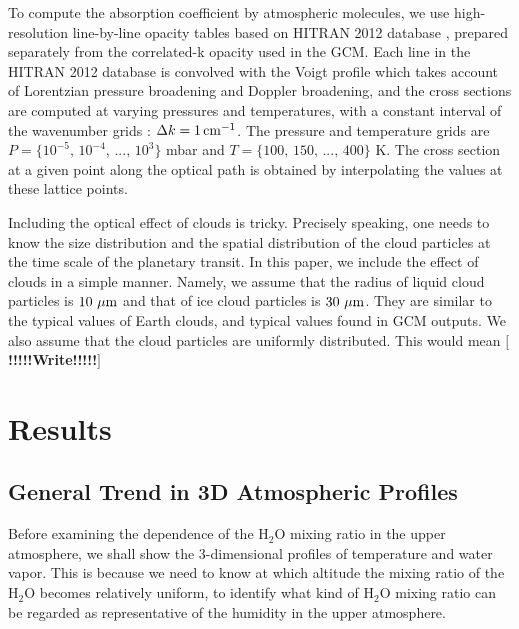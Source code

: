 \documentclass[11pt,numberedappendix,twocolappendix,]{emulateapj}
\def\water{H$_2$O }
\def\memo#1{\color{red}$[${\bf #1}$]$ \color{black}}
\begin{document}
To compute the absorption coefficient by atmospheric molecules, we use high-resolution line-by-line opacity tables based on HITRAN 2012 database \citep{Rothman2013}, prepared separately from the correlated-k opacity used in the GCM. 
Each line in the HITRAN 2012 database is convolved with the Voigt profile which takes account of Lorentzian pressure broadening and Doppler broadening, 
and the cross sections are computed at varying pressures and temperatures, with a constant interval of the wavenumber grids : $\Delta k = 1\,{\rm cm}^{-1}$. 
The pressure and temperature grids are $P = \{10^{-5},\, 10^{-4},\,...,\,10^3\}$ mbar and $T = \{100,\, 150,\,...,\, 400\}$ K. 
The cross section at a given point along the optical path is obtained by interpolating the values at these lattice points. 

Including the optical effect of clouds is tricky. 
Precisely speaking, one needs to know the size distribution and the spatial distribution of the cloud particles at the time scale of the planetary transit. 
In this paper, we include the effect of clouds in a simple manner. 
Namely, we assume that the radius of liquid cloud particles is $10~\mu {\rm m}$ and that of ice cloud particles is $30~\mu {\rm m}$. 
They are similar to the typical values of Earth clouds, and typical values found in GCM outputs. 
We also assume that the cloud particles are uniformly distributed. 
This would mean 
\memo{!!!!!Write!!!!!}



\section{Results}
\label{s:results}


\subsection{General Trend in 3D Atmospheric Profiles}
\label{ss:result_H2Omixingratio}



Before examining the dependence of the \water mixing ratio in the upper atmosphere, we shall show the 3-dimensional profiles of temperature and water vapor. 
This is because we need to know at which altitude the mixing ratio of the \water becomes relatively uniform, to identify what kind of \water mixing ratio can be regarded as representative of the humidity in the upper atmosphere. 
\end{document}

